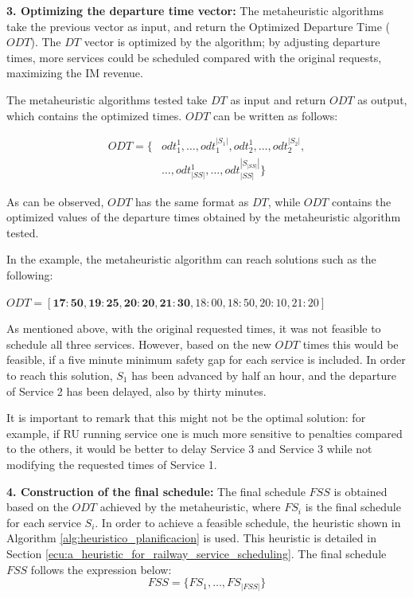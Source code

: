 \documentclass[Afour,sagev,times]{sagej}
\begin{document}
\noindent \textbf{3. Optimizing the departure time vector:} The metaheuristic algorithms take the previous vector as input, and return the Optimized Departure Time ($ODT$). The $DT$ vector is optimized by the algorithm; by adjusting departure times, more services could be scheduled compared with the original requests, maximizing the \gls{IM} revenue.

The metaheuristic algorithms tested take $DT$ as input and return $ODT$ as output, which contains the optimized times. $ ODT $ can be written as follows:
    
\begin{equation}\label{ecu:opt_departure_times}
\begin{aligned}
    ODT = \{ & odt_1^1, \dots, odt_1^{|S_1|}, odt_2^1, \dots, odt_2^{|S_2|}, \\
             & \dots, odt_{|SS|}^1, \dots, odt_{|SS|}^{|S_{|SS|}|} \}
\end{aligned}
\end{equation}
    
    As can be observed, $ODT$ has the same format as $DT$, while $ ODT $ contains the optimized values of the departure times obtained by the metaheuristic algorithm tested.

    In the example, the metaheuristic algorithm can reach solutions such as the following: 
    
    $ODT = [\mathbf{17:50}, \mathbf{19:25}, \mathbf{20:20}, \mathbf{21:30}, 18:00, 18:50, 20:10, 21:20]$

    As mentioned above, with the original requested times, it was not feasible to schedule all three services. However, based on the new $ODT$ times this would be feasible, if a five minute minimum safety gap for each service is included. In order to reach this solution, $S_1$ has been advanced by half an hour, and the departure of Service 2 has been delayed, also by thirty minutes.        

    It is important to remark that this might not be the optimal solution: for example, if \gls{RU} running service one is much more sensitive to penalties compared to the others, it would be better to delay Service 3 and Service 3 while not modifying the requested times of Service 1.
    
\noindent  \textbf{4. Construction of the final schedule:} The final schedule $FSS$ is obtained based on the $ODT$ achieved by the metaheuristic, where $FS_i$ is the final schedule for each service $S_i$. In order to achieve a feasible schedule, the heuristic shown in Algorithm \ref{alg:heuristico_planificacion} is used. This heuristic is detailed in Section \ref{ecu:a_heuristic_for_railway_service_scheduling}. The final schedule $FSS$ follows the expression below:
    \begin{equation}\label{ecu:final_set_of_schedule}
        FSS = \{ FS_1, \dots, FS_{|FSS|} \}
    \end{equation}
    
\end{document}
